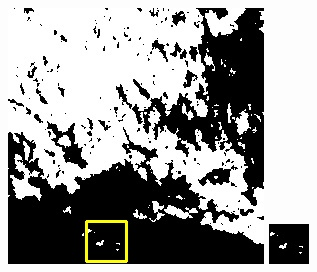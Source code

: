 \documentclass[UTF8]{ctexart}
\begin{document}
\begin{figure}[H]
{\begin{minipage}[b]{0.15\linewidth}
            \includegraphics[width=1\linewidth]{../log/spoon2/cut2/LC81620432014072LGN00_16237_mask.jpg}\vspace{4pt}
            \includegraphics[width=1\linewidth]{../log/spoon2/cut2/tmp_cut_LC81620432014072LGN00_16237_mask.jpg}\vspace{4pt}

\end{minipage}}
\end{figure}
\end{document}
